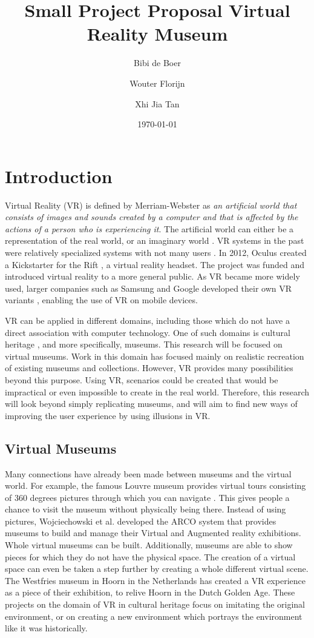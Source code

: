 \documentclass[a4paper]{article}
\title{Small Project Proposal Virtual Reality Museum}
\author{Bibi de Boer \and Wouter Florijn \and Xhi Jia Tan}
\date{\today}
\begin{document}
\maketitle

\section{Introduction}

Virtual Reality (VR) is defined by Merriam-Webster \cite{merriam} as \emph{an artificial world that consists of images and sounds created by a computer and that is affected by the actions of a person who is experiencing it}. The artificial world can either be a representation of the real world, or an imaginary world \cite{martens}. VR systems in the past were relatively specialized systems with not many users \cite{martens}. In 2012, Oculus created a Kickstarter \cite{kickstarter} for the Rift \cite{oculus}, a virtual reality headset. The project was funded and  introduced virtual reality to a more general public. As VR became more widely used, larger companies such as Samsung and Google developed their own VR variants \cite{gearvr, cardboard}, enabling the use of VR on mobile devices. 

VR can be applied in different domains, including those which do not have a direct association with computer technology. One of such domains is cultural heritage \cite{wojciechowski}, and more specifically, museums. This research will be focused on virtual museums. Work in this domain has focused mainly on realistic recreation of existing museums and collections. However, VR provides many possibilities beyond this purpose. Using VR, scenarios could be created that would be impractical or even impossible to create in the real world. Therefore, this research will look beyond simply replicating museums, and will aim to find new ways of improving the user experience by using illusions in VR.


\subsection{Virtual Museums}
Many connections have already been made between museums and the virtual  world. For example, the famous Louvre museum provides virtual tours consisting of 360 degrees pictures through which you can navigate \cite{louvre}. This gives people a chance to visit the museum without physically being there. Instead of using pictures, Wojciechowski et al. \cite{wojciechowski} developed the ARCO system that provides museums to build and manage their Virtual and Augmented reality exhibitions. Whole virtual museums can be built. Additionally, museums are able to show pieces for which they do not have the physical space. The creation of a virtual space can even be taken a step further by creating a whole different virtual scene. The Westfries museum in Hoorn in the Netherlands has created a VR experience \cite{westfries} as a piece of their exhibition, to relive Hoorn in the Dutch Golden Age.
These projects on the domain of VR in cultural heritage focus on imitating the original environment, or on creating a new environment which portrays the environment like it was historically.
\end{document}
